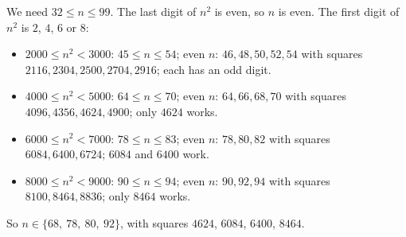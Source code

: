 We need $32\le n\le99$. The last digit of $n^2$ is even, so $n$ is even. The first digit of $n^2$ is $2$, $4$, $6$ or $8$:
\begin{itemize}
\item $2000\le n^2<3000$: $45\le n\le54$; even $n$: $46,48,50,52,54$ with squares $2116,2304,2500,2704,2916$; each has an odd digit.
\item $4000\le n^2<5000$: $64\le n\le70$; even $n$: $64,66,68,70$ with squares $4096,4356,4624,4900$; only $4624$ works.
\item $6000\le n^2<7000$: $78\le n\le83$; even $n$: $78,80,82$ with squares $6084,6400,6724$; $6084$ and $6400$ work.
\item $8000\le n^2<9000$: $90\le n\le94$; even $n$: $90,92,94$ with squares $8100,8464,8836$; only $8464$ works.
\end{itemize}
So $n\in\boxed{\{68,\ 78,\ 80,\ 92\}}$, with squares $4624$, $6084$, $6400$, $8464$.
